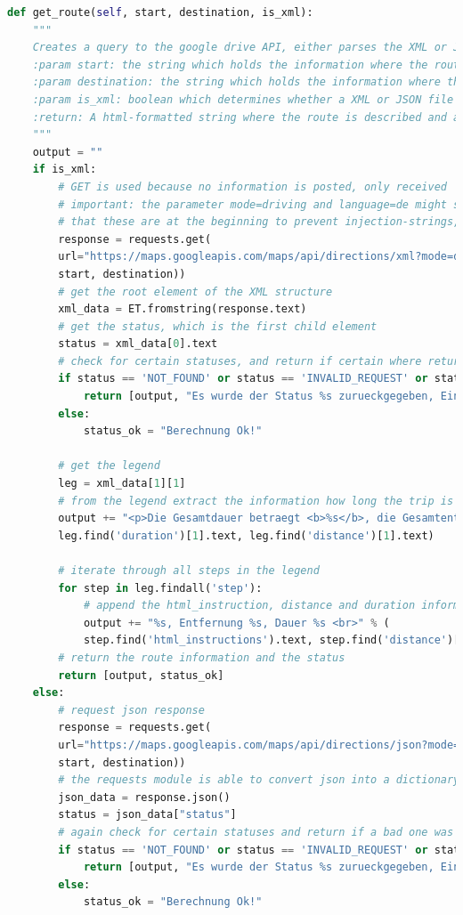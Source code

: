 \begin{lstlisting}[language=python]
def get_route(self, start, destination, is_xml):
	"""
	Creates a query to the google drive API, either parses the XML or JSON File
	:param start: the string which holds the information where the route is to be started
	:param destination: the string which holds the information where the route ends
	:param is_xml: boolean which determines whether a XML or JSON file is to be requested
	:return: A html-formatted string where the route is described and a status for the GUI
	"""
	output = ""
	if is_xml:
		# GET is used because no information is posted, only received
		# important: the parameter mode=driving and language=de might seem unnecessary, but its important
		# that these are at the beginning to prevent injection-strings, for example 'Jaegerstrasse&mode=walking'
		response = requests.get(
		url="https://maps.googleapis.com/maps/api/directions/xml?mode=driving&language=de&origin=%s&destination=%s" % (
		start, destination))
		# get the root element of the XML structure
		xml_data = ET.fromstring(response.text)
		# get the status, which is the first child element
		status = xml_data[0].text
		# check for certain statuses, and return if certain where returned
		if status == 'NOT_FOUND' or status == 'INVALID_REQUEST' or status == 'ZERO_RESULTS':
			return [output, "Es wurde der Status %s zurueckgegeben, Eingabe ueberpruefen!" % (status)]
		else:
			status_ok = "Berechnung Ok!"
		
		# get the legend
		leg = xml_data[1][1]
		# from the legend extract the information how long the trip is in duration and distance
		output += "<p>Die Gesamtdauer betraegt <b>%s</b>, die Gesamtentfernung: <b>%s</b> </p>" % (
		leg.find('duration')[1].text, leg.find('distance')[1].text)
		
		# iterate through all steps in the legend
		for step in leg.findall('step'):
			# append the html_instruction, distance and duration information to the output string
			output += "%s, Entfernung %s, Dauer %s <br>" % (
			step.find('html_instructions').text, step.find('distance')[1].text, step.find('duration')[1].text)
		# return the route information and the status
		return [output, status_ok]
	else:
		# request json response
		response = requests.get(
		url="https://maps.googleapis.com/maps/api/directions/json?mode=driving&language=de&origin=%s&destination=%s" % (
		start, destination))
		# the requests module is able to convert json into a dictionary which is more easy to work with
		json_data = response.json()
		status = json_data["status"]
		# again check for certain statuses and return if a bad one was returned
		if status == 'NOT_FOUND' or status == 'INVALID_REQUEST' or status == 'ZERO_RESULTS':
			return [output, "Es wurde der Status %s zurueckgegeben, Eingabe ueberpruefen!" % (status)]
		else:
			status_ok = "Berechnung Ok!"
		

\end{lstlisting}
